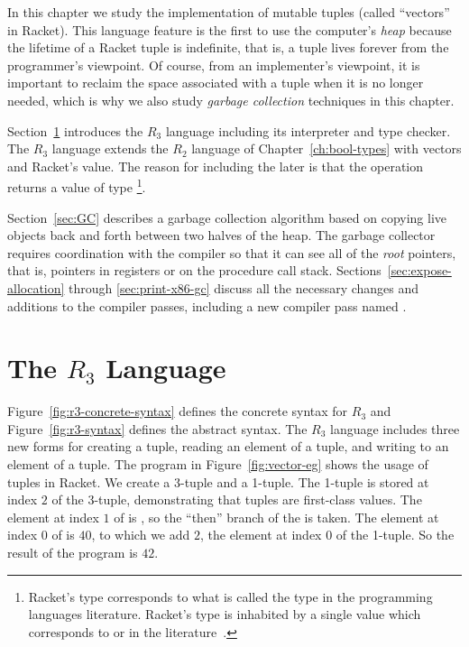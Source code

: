 \documentclass[11pt]{book}
\begin{document}
In this chapter we study the implementation of mutable tuples (called
``vectors'' in Racket). This language feature is the first to use the
computer's \emph{heap} because the lifetime of a Racket tuple is
indefinite, that is, a tuple lives forever from the programmer's
viewpoint. Of course, from an implementer's viewpoint, it is important
to reclaim the space associated with a tuple when it is no longer
needed, which is why we also study \emph{garbage collection}
techniques in this chapter.

Section~\ref{sec:r3} introduces the $R_3$ language including its
interpreter and type checker. The $R_3$ language extends the $R_2$
language of Chapter~\ref{ch:bool-types} with vectors and Racket's
 value. The reason for including the later is that the
 operation returns a value of type
\footnote{Racket's  type corresponds to what is
  called the  type in the programming languages
  literature. Racket's  type is inhabited by a single value
   which corresponds to  or \code{()} in the
  literature~\citep{Pierce:2002hj}.}.

Section~\ref{sec:GC} describes a garbage collection algorithm based on
copying live objects back and forth between two halves of the
heap. The garbage collector requires coordination with the compiler so
that it can see all of the \emph{root} pointers, that is, pointers in
registers or on the procedure call stack.
Sections~\ref{sec:expose-allocation} through \ref{sec:print-x86-gc}
discuss all the necessary changes and additions to the compiler
passes, including a new compiler pass named .

\section{The $R_3$ Language}
\label{sec:r3}

Figure~\ref{fig:r3-concrete-syntax} defines the concrete syntax for
$R_3$ and Figure~\ref{fig:r3-syntax} defines the abstract syntax.  The
$R_3$ language includes three new forms for creating a tuple, reading
an element of a tuple, and writing to an element of a tuple. The
program in Figure~\ref{fig:vector-eg} shows the usage of tuples in
Racket. We create a 3-tuple  and a 1-tuple. The 1-tuple is
stored at index $2$ of the 3-tuple, demonstrating that tuples are
first-class values.  The element at index $1$ of  is
, so the ``then'' branch of the  is taken.  The
element at index $0$ of  is $40$, to which we add $2$, the
element at index $0$ of the 1-tuple. So the result of the program is
$42$.
\end{document}
